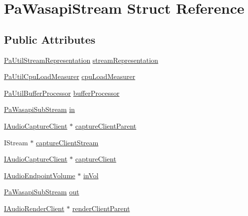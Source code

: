 \hypertarget{struct_pa_wasapi_stream}{}\section{Pa\+Wasapi\+Stream Struct Reference}
\label{struct_pa_wasapi_stream}
\subsection*{Public Attributes}
\begin{DoxyCompactItemize}
\item 
\hyperlink{struct_pa_util_stream_representation}{Pa\+Util\+Stream\+Representation} \hyperlink{struct_pa_wasapi_stream_a05e4c67863aa5f87417a7c0ea031d1ee}{stream\+Representation}
\item 
\hyperlink{struct_pa_util_cpu_load_measurer}{Pa\+Util\+Cpu\+Load\+Measurer} \hyperlink{struct_pa_wasapi_stream_aec37a2f4bcafd3f1a595a46e5393bd64}{cpu\+Load\+Measurer}
\item 
\hyperlink{struct_pa_util_buffer_processor}{Pa\+Util\+Buffer\+Processor} \hyperlink{struct_pa_wasapi_stream_ae7e8fbc3c2a11f64f16a7f393c5e9c63}{buffer\+Processor}
\item 
\hyperlink{struct_pa_wasapi_sub_stream}{Pa\+Wasapi\+Sub\+Stream} \hyperlink{struct_pa_wasapi_stream_a0800ee4bf755e3ea24aa501c1ae4edc9}{in}
\item 
\hyperlink{audioclient_8h_a2d3108bb1604145f734949a5cb7a578a}{I\+Audio\+Capture\+Client} $\ast$ \hyperlink{struct_pa_wasapi_stream_a79c5cda43724aea8ff7d283a2ac66976}{capture\+Client\+Parent}
\item 
I\+Stream $\ast$ \hyperlink{struct_pa_wasapi_stream_a315d06c7f23d23f05f90579a80d0530d}{capture\+Client\+Stream}
\item 
\hyperlink{audioclient_8h_a2d3108bb1604145f734949a5cb7a578a}{I\+Audio\+Capture\+Client} $\ast$ \hyperlink{struct_pa_wasapi_stream_a39f6a52addd1b6454fc7e151446fcd2c}{capture\+Client}
\item 
\hyperlink{endpointvolume_8h_a0aa518a24cb3834bf372f46cfc94e3cf}{I\+Audio\+Endpoint\+Volume} $\ast$ \hyperlink{struct_pa_wasapi_stream_a035111d1e825146eae105bd83d810397}{in\+Vol}
\item 
\hyperlink{struct_pa_wasapi_sub_stream}{Pa\+Wasapi\+Sub\+Stream} \hyperlink{struct_pa_wasapi_stream_a995c67eb832e26e5f9e092e06d93799d}{out}
\item 
\hyperlink{audioclient_8h_a3d3202e827ce9328a16178551d97746e}{I\+Audio\+Render\+Client} $\ast$ \hyperlink{struct_pa_wasapi_stream_a28a861cf6e64e4f1b45d4f774052cc42}{render\+Client\+Parent}

\end{DoxyCompactItemize}
